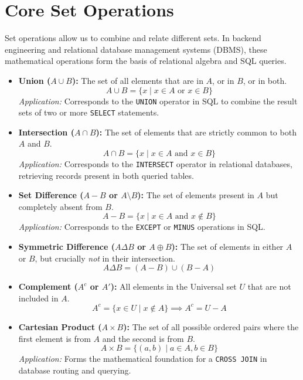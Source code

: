 \documentclass{article}
\begin{document}
\section{Core Set Operations}
Set operations allow us to combine and relate different sets. In backend engineering and relational database management systems (DBMS), these mathematical operations form the basis of relational algebra and SQL queries.

\begin{itemize}
    \item \textbf{Union ($A \cup B$):} The set of all elements that are in $A$, or in $B$, or in both.
    $$A \cup B = \{x \mid x \in A \text{ or } x \in B\}$$
    \textit{Application:} Corresponds to the \texttt{UNION} operator in SQL to combine the result sets of two or more \texttt{SELECT} statements.
    
    \item \textbf{Intersection ($A \cap B$):} The set of elements that are strictly common to both $A$ and $B$.
    $$A \cap B = \{x \mid x \in A \text{ and } x \in B\}$$
    \textit{Application:} Corresponds to the \texttt{INTERSECT} operator in relational databases, retrieving records present in both queried tables.
    
    \item \textbf{Set Difference ($A - B$ or $A \setminus B$):} The set of elements present in $A$ but completely absent from $B$.
    $$A - B = \{x \mid x \in A \text{ and } x \notin B\}$$
    \textit{Application:} Corresponds to the \texttt{EXCEPT} or \texttt{MINUS} operations in SQL.
    
    \item \textbf{Symmetric Difference ($A \Delta B$ or $A \oplus B$):} The set of elements in either $A$ or $B$, but crucially \textit{not} in their intersection.
    $$A \Delta B = (A - B) \cup (B - A)$$
    
    \item \textbf{Complement ($A^c$ or $A'$):} All elements in the Universal set $U$ that are not included in $A$.
    $$A^c = \{x \in U \mid x \notin A\} \implies A^c = U - A$$
    
    \item \textbf{Cartesian Product ($A \times B$):} The set of all possible ordered pairs where the first element is from $A$ and the second is from $B$.
    $$A \times B = \{(a, b) \mid a \in A, b \in B\}$$
    \textit{Application:} Forms the mathematical foundation for a \texttt{CROSS JOIN} in database routing and querying.
\end{itemize}
\end{document}
